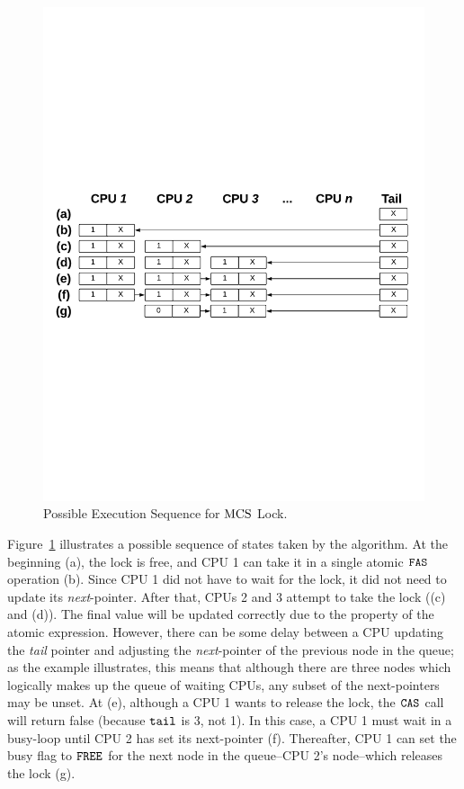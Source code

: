 \begin{figure}
\begin{center}
\includegraphics[width=0.9\linewidth]{figs/mcslock/mcsex}
\end{center}
\caption{Possible Execution Sequence for  $\mathrm{MCS}$ Lock.}
\label{fig:chapter:mcslock:mcs-example}
\end{figure}

Figure~\ref{fig:chapter:mcslock:mcs-example} 
illustrates a possible sequence of states taken by the algorithm. 
At the beginning (a),
the lock is free, and CPU 1 can take it in a single atomic ${\mathrm{\texttt{FAS}}}$ operation (b). 
Since CPU 1 did not have to wait for the lock, it did not need to update its \textit{next}-pointer. 
After that, CPUs 2 and 3 attempt to take the lock ((c) and (d)). 
The final value will be updated correctly due to the property of the atomic expression.
 However, there can be some delay between a CPU updating the \textit{tail} pointer and adjusting the \textit{next}-pointer of the previous node in the queue; as the example illustrates, this means that although there are three nodes which logically makes up the queue of waiting CPUs, 
 any subset of the next-pointers may be unset. 
 At (e), although a CPU 1 wants to release the lock, 
 the ${\mathrm{\texttt{CAS}}}$ call will return false (because ${\mathrm{\texttt{tail}}}$ is 3, not 1). 
 In this case, a CPU 1 must wait in a busy-loop until CPU 2 has set its next-pointer (f). 
 Thereafter, CPU 1 can set the busy flag to ${\mathrm{\texttt{FREE}}}$ for the next node in the queue--CPU 2’s node--which releases the lock (g).






